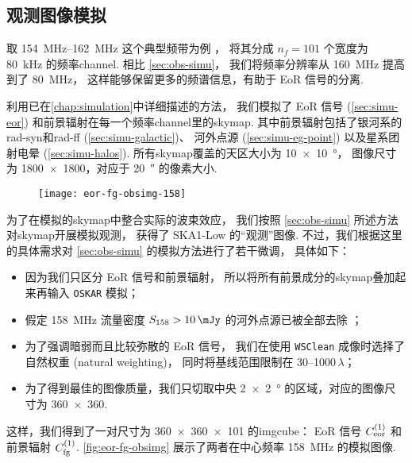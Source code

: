 \subsection{观测图像模拟}
\label{sec:cdae-images}

取 \SIrange{154}{162}{\MHz} 这个典型频带为例 \cite{datta2010}，
将其分成 $n_f = 101$ 个宽度为 \SI{80}{\kHz} 的频率\ac{channel}.
相比 \autoref{sec:obs-simu}，
我们将频率分辨率从 \SI{160}{\MHz} 提高到了 \SI{80}{\MHz}，
这样能够保留更多的频谱信息，有助于 EoR 信号的分离.

利用已在\autoref{chap:simulation}中详细描述的方法，
我们模拟了 EoR 信号 (\autoref{sec:simu-eor})
和前景辐射在每一个频率\ac{channel}里的\ac{skymap}.
其中前景辐射包括了银河系的\ac{rad-syn}和\ac{rad-ff} (\autoref{sec:simu-galactic})、
河外点源 (\autoref{sec:simu-eg-point})
以及星系团射电晕 (\autoref{sec:simu-halos}).
所有\ac{skymap}覆盖的天区大小为 \SI{10 x 10}{\degree}，
图像尺寸为 \num{1800 x 1800}，对应于 \SI{20}{\arcsecond} 的像素大小.

\begin{figure}[htp]
  \centering
  \texttt{[image: eor-fg-obsimg-158]}
  \label{fig:eor-fg-obsimg}
\end{figure}

为了在模拟的\ac{skymap}中整合实际的波束效应，
我们按照 \autoref{sec:obs-simu} 所述方法对\ac{skymap}开展模拟观测，
获得了 SKA1-Low 的\enquote{观测}图像.
不过，我们根据这里的具体需求对 \autoref{sec:obs-simu} 的模拟方法进行了若干微调，
具体如下：
\begin{itemize}
  \item 因为我们只区分 EoR 信号和前景辐射，
    所以将所有前景成分的\ac{skymap}叠加起来再输入 \texttt{OSKAR} 模拟；
  \item 假定 \SI{158}{\MHz} 流量密度 $S_{158} > \SI{10}{\mJy}$
    的河外点源已被全部去除 \cite{liu2009ps}；
  \item 为了强调暗弱而且比较弥散的 EoR 信号，
    我们在使用 \texttt{WSClean} 成像时选择了自然权重 (natural weighting)，
    同时将基线范围限制在 \numrange{30}{1000}$\,\lambda$；
  \item 为了得到最佳的图像质量，我们只切取中央 \SI{2 x 2}{\degree}
    的区域，对应的图像尺寸为 \num{360 x 360}.
\end{itemize}
这样，我们得到了一对尺寸为 \num{360 x 360 x 101} 的\ac{imgcube}：
EoR 信号 $C_{\mathrm{eor}}^{(1)}$ 和前景辐射 $C_{\mathrm{fg}}^{(1)}$.
\autoref{fig:eor-fg-obsimg} 展示了两者在中心频率 \SI{158}{\MHz} 的模拟图像.

